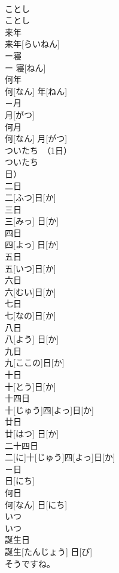 \documentclass[8pt]{extreport}
\begin{document}
\begin{CJK}{UTF8}{min}
\\	ことし	
\\	ことし	
\\	来年	
\\	来年[らいねん]	
\\	ー寝	
\\	ー 寝[ねん]	
\\	何年	
\\	何[なん] 年[ねん]	
\\	－月	
\\	月[がつ]	
\\	何月	
\\	何[なん] 月[がつ]	
\\	ついたち　（1日）	
\\	ついたち　
\\	日）	
\\	二日	
\\	二[ふつ]日[か]	
\\	三日	
\\	三[みっ] 日[か]	
\\	四日	
\\	四[よっ] 日[か]	
\\	五日	
\\	五[いつ]日[か]	
\\	六日	
\\	六[むい]日[か]	
\\	七日	
\\	七[なの]日[か]	
\\	八日	
\\	八[よう] 日[か]	
\\	九日	
\\	九[ここの]日[か]	
\\	十日	
\\	十[とう]日[か]	
\\	十四日	
\\	十[じゅう]四[よっ]日[か]	
\\	廿日	
\\	廿[はつ] 日[か]	
\\	二十四日	
\\	二[に]十[じゅう]四[よっ]日[か]	
\\	－日	
\\	日[にち]	
\\	何日	
\\	何[なん] 日[にち]	
\\	いつ	
\\	いつ	
\\	誕生日	
\\	誕生[たんじょう] 日[び]	
\\	そうですね。	

\end{CJK}
\end{document}
